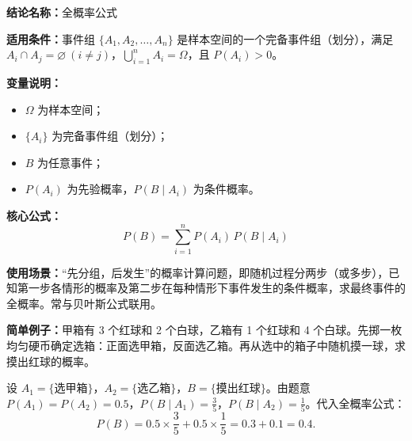 \textbf{结论名称：}全概率公式

\textbf{适用条件：}事件组 \(\{A_1,A_2,\dots,A_n\}\) 是样本空间的一个完备事件组（划分），满足 \(A_i \cap A_j = \varnothing\ (i \neq j)\)，\(\bigcup_{i=1}^{n} A_i = \Omega\)，且 \(P(A_i) > 0\)。

\textbf{变量说明：}
\begin{itemize}
  \item \(\Omega\) 为样本空间；
  \item \(\{A_i\}\) 为完备事件组（划分）；
  \item \(B\) 为任意事件；
  \item \(P(A_i)\) 为先验概率，\(P(B \mid A_i)\) 为条件概率。
\end{itemize}

\textbf{核心公式：}
\[
  \boxed{\, P(B) = \sum_{i=1}^{n} P(A_i)\,P(B \mid A_i) \,}
\]

\textbf{使用场景：}“先分组，后发生”的概率计算问题，即随机过程分两步（或多步），已知第一步各情形的概率及第二步在每种情形下事件发生的条件概率，求最终事件的全概率。常与贝叶斯公式联用。

\textbf{简单例子：}甲箱有 3 个红球和 2 个白球，乙箱有 1 个红球和 4 个白球。先掷一枚均匀硬币确定选箱：正面选甲箱，反面选乙箱。再从选中的箱子中随机摸一球，求摸出红球的概率。

设 \(A_1=\{\text{选甲箱}\}\)，\(A_2=\{\text{选乙箱}\}\)，\(B=\{\text{摸出红球}\}\)。由题意 \(P(A_1)=P(A_2)=0.5\)，\(P(B\mid A_1)=\frac{3}{5}\)，\(P(B\mid A_2)=\frac{1}{5}\)。代入全概率公式：
\[
P(B)=0.5\times\frac{3}{5}+0.5\times\frac{1}{5}=0.3+0.1=0.4.
\]